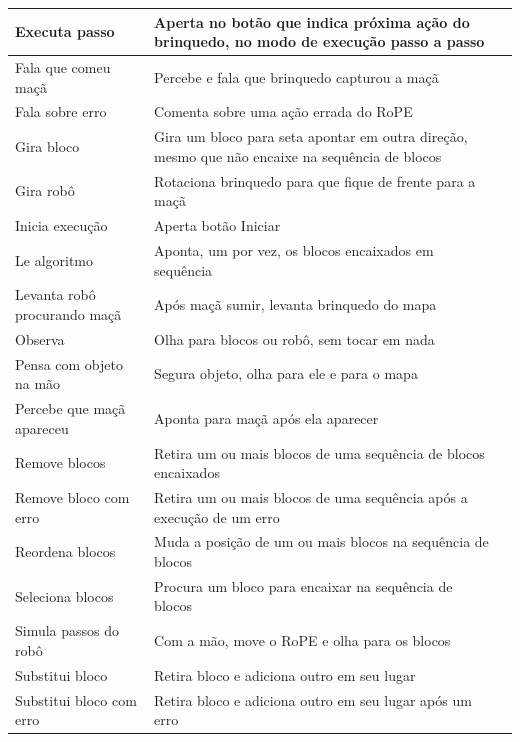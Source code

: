 \begin{quadro}[!h]
\begin{table_env}
\begin{tabular}{@{}l m{} c@{}}
        Executa passo & Aperta no botão que indica próxima ação do brinquedo, no modo de execução passo a passo \\ \hline
        Fala que comeu maçã & Percebe e fala que brinquedo capturou a maçã \\ \hline
        Fala sobre erro & Comenta sobre uma ação errada do RoPE \\ \hline
        Gira bloco & Gira um bloco para seta apontar em outra direção, mesmo que não encaixe na sequência de blocos \\ \hline
        Gira robô & Rotaciona brinquedo para que fique de frente para a maçã \\ \hline
        Inicia execução & Aperta botão Iniciar  \\ \hline
        Le algoritmo & Aponta, um por vez, os blocos encaixados em sequência \\ \hline
        Levanta robô procurando maçã & Após maçã sumir, levanta brinquedo do mapa \\ \hline
        Observa & Olha para blocos ou robô, sem tocar em nada \\ \hline
        Pensa com objeto na mão & Segura objeto, olha para ele e para o mapa \\ \hline
        Percebe que maçã apareceu & Aponta para maçã após ela aparecer \\ \hline
        Remove blocos & Retira um ou mais blocos de uma sequência de blocos encaixados \\ \hline
        Remove bloco com erro & Retira um ou mais blocos de uma sequência após a execução de um erro \\ \hline
        Reordena blocos & Muda a posição de um ou mais blocos na sequência de blocos \\ \hline
        Seleciona blocos & Procura um bloco para encaixar na sequência de blocos \\ \hline
        Simula passos do robô & Com a mão, move o RoPE e olha para os blocos \\ \hline
        Substitui bloco & Retira bloco e adiciona outro em seu lugar \\ \hline
        Substitui bloco com erro & Retira bloco e adiciona outro em seu lugar após um erro 
        \\ \bottomrule
        \end{tabular}
    \end{table_env}
    \sourceauthor
 \end{quadro}

